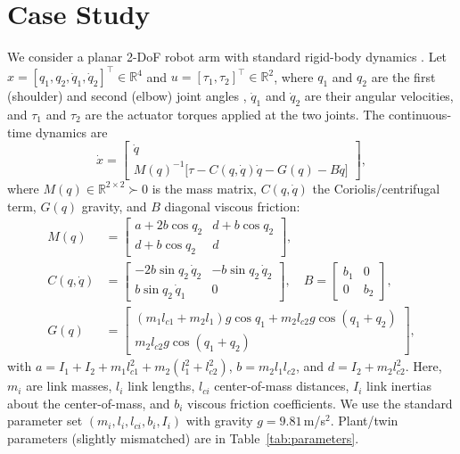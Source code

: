 \documentclass[letterpaper, 10 pt, conference]{ieeeconf}
\begin{document}
\section{Case Study}\label{sec:case}
We consider a planar 2-DoF robot arm with standard rigid-body dynamics \cite{Spong2006}. 
Let $x=[q_1,q_2,\dot q_1,\dot q_2]^\top\!\in\mathbb{R}^4$ and $u=[\tau_1,\tau_2]^\top\!\in\mathbb{R}^2$, 
where $q_1$ and $q_2$ are the first (shoulder) and second (elbow) joint angles , 
$\dot q_1$ and $\dot q_2$ are their angular velocities, and 
$\tau_1$ and $\tau_2$ are the actuator torques applied at the two joints.
The continuous-time dynamics are
\[
\dot{x}=\begin{bmatrix}\dot q \\ M(q)^{-1}\big[\tau - C(q,\dot q)\dot q - G(q) - B\dot q\big]\end{bmatrix},
\]
where $M(q)\in\mathbb{R}^{2\times2}\!\succ0$ is the mass matrix, $C(q,\dot q)$ the Coriolis/centrifugal term, $G(q)$ gravity, and $B$ diagonal viscous friction:
\begin{align*}
M(q) &= \begin{bmatrix}
a + 2b\cos q_2 & d + b\cos q_2 \\
d + b\cos q_2 & d
\end{bmatrix},\\
C(q,\dot q) &= \begin{bmatrix}
-2b\sin q_2\,\dot q_2 & -b\sin q_2\,\dot q_2 \\
b\sin q_2\,\dot q_1 & 0
\end{bmatrix}, \quad B = \begin{bmatrix} b_1 & 0 \\ 0 & b_2 \end{bmatrix},\\
G(q) &= \begin{bmatrix}
(m_1l_{c1} + m_2l_1)g\cos q_1 + m_2l_{c2}g\cos(q_1+q_2) \\
m_2l_{c2}g\cos(q_1+q_2)
\end{bmatrix},
\end{align*}
with $a = I_1 + I_2 + m_1 l_{c1}^2 + m_2(l_1^2 + l_{c2}^2)$, $b = m_2 l_1 l_{c2}$, and $d = I_2 + m_2 l_{c2}^2$. Here, $m_i$ are link masses, $l_i$ link lengths, $l_{ci}$ center-of-mass distances, $I_i$ link inertias about the center-of-mass, and $b_i$ viscous friction coefficients. We use the standard parameter set $(m_i,l_i,l_{ci},b_i,I_i)$ with gravity $g=9.81$\,m/s$^2$. Plant/twin parameters (slightly mismatched) are in Table~\ref{tab:parameters}.
\end{document}
